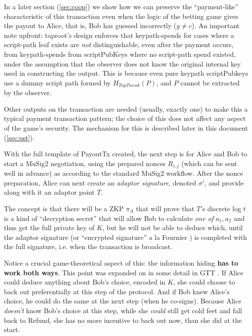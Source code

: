 \documentclass[11pt]{article}
\begin{document}
In a later section (\ref{sec:coop}) we show how we can preserve the ``payment-like'' characteristic of this transaction even when the logic of the betting game gives the payout to Alice, that is, Bob has guessed incorrectly ($y\neq c$). An important note upfront: taproot's design \cite{bip341} enforces that keypath-spends for cases where a script-path leaf exists are \emph{not} distinguishable, even after the payment occurs, from keypath-spends from scriptPubKeys where no script-path spend existed, under the assumption that the observer does not know the original internal key used in constructing the output. This is because even pure keypath scriptPubkeys use a dummy script path formed by $H_{TapTweak}(P)$, and $P$ cannot be extracted by the observer.

Other outputs on the transaction are needed (usually, exactly one) to make this a typical payment transaction pattern; the choice of this does not affect any aspect of the game's security. The mechanism for this is described later in this document (\ref{sec:pst}).

With the full template of PayoutTx created, the next step is for Alice and Bob to start a MuSig2 negotiation, using the prepared nonces $R_{i,j}$ (which can be sent well in advance) as according to the standard MuSig2 workflow. After the nonce preparation, Alice can next create an \emph{adaptor signature}, denoted $\sigma'$, and provide along with it an adaptor point $T$.

The concept is that there will be a ZKP $\pi_A$ that will prove that $T$'s discrete log $t$ is a kind of ``decryption secret'' that will allow Bob to calculate \emph{one of} $a_1, a_2$ and thus get the full private key of $K$, but he will not be able to deduce which, until the adaptor signature (or ``encrypted signature'' a la Fournier \cite{fournier}) is completed with the full signature, i.e. when the transaction is broadcast.

Notice a crucial game-theoretical aspect of this: the information hiding \textbf{has to work both ways}. This point was expanded on in some detail in GTT \cite{gerhardt2026}. If Alice could deduce anything about Bob's choice, encoded in $K$, she could choose to back out preferentially at this step of the protocol. And if Bob knew Alice's choice, he could do the same at the next step (when he co-signs). Because Alice \emph{doesn't} know Bob's choice at this step, while she \emph{could} still get cold feet and fall back to Refund, she has no more incentive to back out now, than she did at the start.
\end{document}
